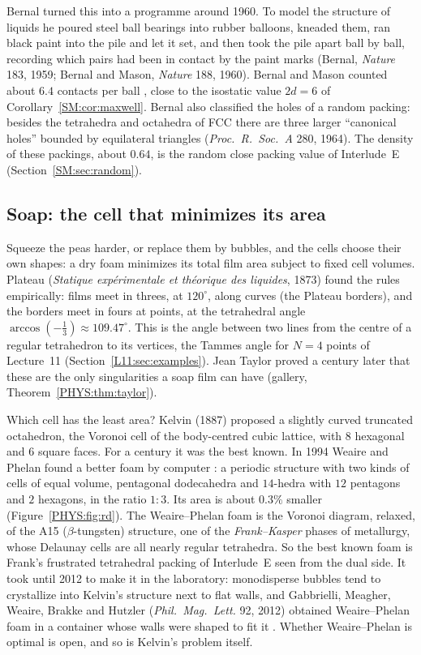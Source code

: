 Bernal turned this into a programme around 1960. To model the structure of liquids he poured steel
ball bearings into rubber balloons, kneaded them, ran black paint into the pile and let it set, and
then took the pile apart ball by ball, recording which pairs had been in contact by the paint marks
(Bernal, \emph{Nature} 183, 1959; Bernal and Mason, \emph{Nature} 188, 1960). Bernal and Mason counted
about $6.4$ contacts per ball , close to the isostatic value $2d=6$ of
Corollary~\ref{SM:cor:maxwell}. Bernal also classified the holes of a random packing: besides the tetrahedra and octahedra of FCC there
are three larger ``canonical holes'' bounded by equilateral triangles (\emph{Proc.\ R.\ Soc.\ A} 280, 1964). The density of these packings, about $0.64$, is the
random close packing value of Interlude~E (Section~\ref{SM:sec:random}).

\subsection*{Soap: the cell that minimizes its area}
Squeeze the peas harder, or replace them by bubbles, and the cells choose their own shapes: a dry
foam minimizes its total film area subject to fixed cell volumes. Plateau (\emph{Statique
exp\'erimentale et th\'eorique des liquides}, 1873) found the rules empirically: films meet in threes, at
$120^\circ$, along curves (the Plateau borders), and the borders meet in fours at points, at the
tetrahedral angle $\arccos(-\frac13)\approx109.47^\circ$. This is the angle between two lines from the
centre of a regular tetrahedron to its vertices, the Tammes angle for $N=4$ points of
Lecture~11 (Section~\ref{L11:sec:examples}). Jean Taylor proved a century later that these are the only
singularities a soap film can have (gallery, Theorem~\ref{PHYS:thm:taylor}).

Which cell has the least area? Kelvin (1887) proposed a slightly curved truncated octahedron, the
Voronoi cell of the body-centred cubic lattice, with $8$ hexagonal and $6$ square faces. For a century
it was the best known. In 1994 Weaire and Phelan found a better foam by computer :
a periodic structure with two kinds of cells of equal volume, pentagonal dodecahedra and $14$-hedra
with $12$ pentagons and $2$ hexagons, in the ratio $1:3$. Its area is about $0.3\%$ smaller
(Figure~\ref{PHYS:fig:rd}). The Weaire--Phelan foam is the Voronoi diagram, relaxed, of the A15
($\beta$-tungsten) structure, one of the \emph{Frank--Kasper} phases of metallurgy, whose Delaunay cells
are all nearly regular tetrahedra. So the best known foam is Frank's frustrated tetrahedral packing of
Interlude~E seen from the dual side. It took until 2012 to make it in the laboratory: monodisperse
bubbles tend to crystallize into Kelvin's structure next to flat walls, and Gabbrielli, Meagher, Weaire, Brakke
and Hutzler (\emph{Phil.\ Mag.\ Lett.} 92, 2012) obtained Weaire--Phelan foam in a container whose walls
were shaped to fit it . Whether Weaire--Phelan is optimal is open, and so is
Kelvin's problem itself.

